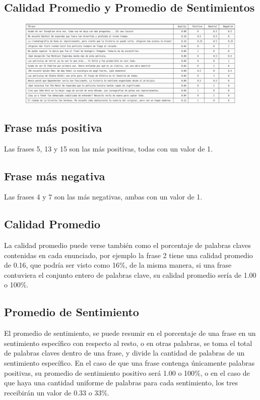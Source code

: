 \documentclass{article}
\begin{document}
    \subsection{Calidad Promedio y Promedio de Sentimientos}
    \begin{figure}[H]
        \centering
        \includegraphics[width=1\linewidth]{assets/results}
    \end{figure}


    \subsection{Frase más positiva}
    Las frases 5, 13 y 15 son las más positivas, todas con un valor de 1.

    \subsection{Frase más negativa}
    Las frases 4 y 7 son las más negativas, ambas con un valor de 1.

    \subsection{Calidad Promedio}
    La calidad promedio puede verse también como el porcentaje de palabras claves contenidas en cada enunciado, por ejemplo la frase 2 tiene una calidad promedio de 0.16, que podría ser visto como 16\%, de la misma manera, si una frase contuviera el conjunto entero de palabras clave, su calidad promedio sería de 1.00 o 100\%.

    \subsection{Promedio de Sentimiento}
    El promedio de sentimiento, se puede resumir en el porcentaje de una frase en un sentimiento específico con respecto al resto, o en otras palabras, se toma el total de palabras claves dentro de una frase, y divide la cantidad de palabras de un sentimiento específico. En el caso de que una frase contenga únicamente palabras positivas, su promedio de sentimiento positivo será 1.00 o 100\%, o en el caso de que haya una cantidad uniforme de palabras para cada sentimiento, los tres receibirán un valor de 0.33 o 33\%.
\end{document}
